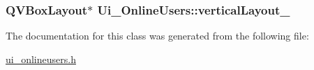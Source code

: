 \hypertarget{classUi__OnlineUsers_aca89e5d2a0b4e36c96cb7d303d1068fe}{
\subsubsection[{vertical\-Layout\-\_\-2}]{\setlength{\rightskip}{0pt plus 5cm}Q\-V\-Box\-Layout$\ast$ Ui\-\_\-\-Online\-Users\-::vertical\-Layout\-\_}}\label{classUi__OnlineUsers_aca89e5d2a0b4e36c96cb7d303d1068fe}


The documentation for this class was generated from the following file\-:\begin{DoxyCompactItemize}
\item 
\hyperlink{ui__onlineusers_8h}{ui\-\_\-onlineusers.\-h}\end{DoxyCompactItemize}
